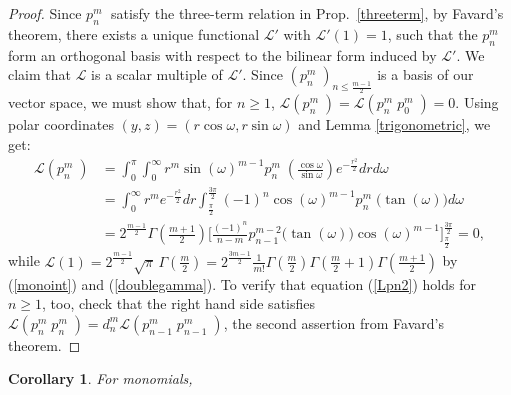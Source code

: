 \documentclass{amsart}
\newcommand{\p}[2]{p_{#1}^{#2}\;\!\!}
\renewcommand{\L}{\mathcal{L}}
\theoremstyle{plain}
\newtheorem{corollary}[theorem]{Corollary}
\theoremstyle{definition}
\theoremstyle{remark}
\begin{document}
\begin{proof}
Since $\p{n}{m}$ satisfy the three-term relation in Prop.~\ref{threeterm}, by Favard's theorem, there exists a unique functional $\L'$ with $\L'(1)=1$, such that the $\p{n}{m}$ form an orthogonal basis with respect to the bilinear form induced by $\L'$. We claim that $\L$ is a scalar multiple of $\L'$.
Since $(\p{n}{m})_{n\leq\frac{m-1}{2}} $ is a basis of our vector space, we must show that, for $n\geq 1$, $\L(\p{n}{m}) = \L(\p{n}{m}\p{0}{m}) =0$.
Using polar coordinates $(y,z) = (r\cos\omega,r\sin\omega)$ and Lemma \ref{trigonometric}, we get:
\begin{align*}
\L(\p{n}{m}) &= \int_0^\pi\!\!\int_0^\infty r^m\sin(\omega)^{m-1} \p{n}{m}\left(\tfrac{\cos\omega}{\sin\omega}\right)e^{-\frac{r^2}{2}}dr d\omega \\
&=\int_0^\infty r^m e^{-\frac{r^2}{2}}dr \int_{\frac{\pi}{2}}^{\frac{3\pi}{2}} (-1)^n \cos(\omega)^{m-1}\p{n}{m}\big(\tan(\omega)\big)d\omega\\
&= 2^{\frac{m-1}{2}}\Gamma\left(\tfrac{m+1}{2}\right)\Big[\tfrac{(-1)^n}{n-m}p_{n-1}^{m-2}\big(\tan(\omega)\big)\cos(\omega)^{m-1} \Big]_{\frac{\pi}{2}}^{\frac{3\pi}{2}} =0,
\end{align*}
while $\L(1) = 2^{\frac{m-1}{2}}\sqrt{\pi}\,\Gamma\!\left(\frac{m}{2}\right)=2^{\frac{3m-1}{2}}  \frac{1}{m!}
\Gamma\left(\frac{m}{2}\right)\Gamma\left(\frac{m}{2}+1\right)\Gamma\left(\frac{m+1}{2}\right)$ by (\ref{monoint}) and (\ref{doublegamma}). To verify that equation (\ref{Lpn2}) holds for $n\geq 1$, too, check that the right hand side satisfies $\L(\p{n}{m}\p{n}{m}) = d_n^m\L(\p{n-1}{m}\p{n-1}{m})$, the second assertion from Favard's theorem. 
\end{proof}
\begin{corollary}
For monomials, 
\end{corollary}
\end{document}
